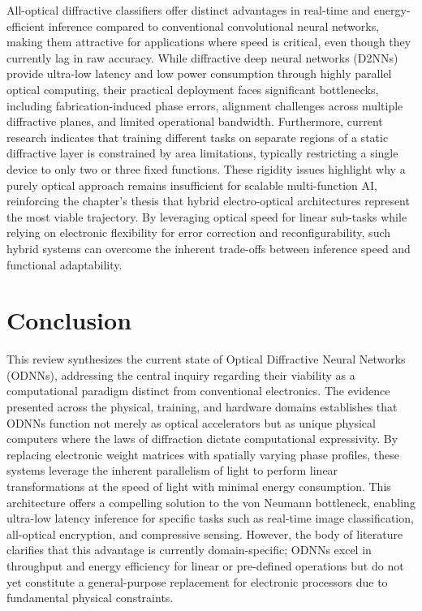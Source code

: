\documentclass[11pt]{article}
\begin{document}
All-optical diffractive classifiers offer distinct advantages in real-time and energy-efficient inference compared to conventional convolutional neural networks, making them attractive for applications where speed is critical, even though they currently lag in raw accuracy. While diffractive deep neural networks (D2NNs) provide ultra-low latency and low power consumption through highly parallel optical computing, their practical deployment faces significant bottlenecks, including fabrication-induced phase errors, alignment challenges across multiple diffractive planes, and limited operational bandwidth. Furthermore, current research indicates that training different tasks on separate regions of a static diffractive layer is constrained by area limitations, typically restricting a single device to only two or three fixed functions. These rigidity issues highlight why a purely optical approach remains insufficient for scalable multi-function AI, reinforcing the chapter's thesis that hybrid electro-optical architectures represent the most viable trajectory. By leveraging optical speed for linear sub-tasks while relying on electronic flexibility for error correction and reconfigurability, such hybrid systems can overcome the inherent trade-offs between inference speed and functional adaptability. \citep{doi_10_1364_ol_593231_ab93febc} \citep{doi_10_1364_oe_598903_731aaac1} \citep{doi_10_48550_arxiv_2411_05748_a91b6f61}

\section{Conclusion}\label{conclusion}

This review synthesizes the current state of Optical Diffractive Neural Networks (ODNNs), addressing the central inquiry regarding their viability as a computational paradigm distinct from conventional electronics. The evidence presented across the physical, training, and hardware domains establishes that ODNNs function not merely as optical accelerators but as unique physical computers where the laws of diffraction dictate computational expressivity. By replacing electronic weight matrices with spatially varying phase profiles, these systems leverage the inherent parallelism of light to perform linear transformations at the speed of light with minimal energy consumption. This architecture offers a compelling solution to the von Neumann bottleneck, enabling ultra-low latency inference for specific tasks such as real-time image classification, all-optical encryption, and compressive sensing. However, the body of literature clarifies that this advantage is currently domain-specific; ODNNs excel in throughput and energy efficiency for linear or pre-defined operations but do not yet constitute a general-purpose replacement for electronic processors due to fundamental physical constraints.
\end{document}
